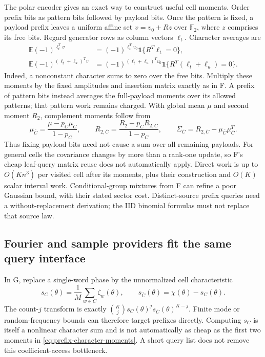 \documentclass[10pt,a4paper]{article}
\newcommand{\E}{\mathbb E}
\newcommand{\ind}{\mathbf 1}
\begin{document}
The polar encoder gives an exact way to construct useful cell moments. Order prefix bits as pattern bits
followed by payload bits. Once the pattern is fixed, a payload prefix leaves a uniform affine set
$v=v_0+Rz$ over $\mathbb F_2$, where $z$ comprises its free bits. Regard generator rows as column vectors
$\ell_t$. Character averages are
\begin{align}
 \E(-1)^{\ell_t^Tv}
   &=(-1)^{\ell_t^Tv_0}\ind\{R^T\ell_t=0\},\\
 \E(-1)^{(\ell_t+\ell_u)^Tv}
   &=(-1)^{(\ell_t+\ell_u)^Tv_0}\ind\{R^T(\ell_t+\ell_u)=0\}.
 \label{eq:prefix-character-moments}
\end{align}
Indeed, a nonconstant character sums to zero over the free bits. Multiply these moments by the fixed
amplitudes and insertion matrix exactly as in F. A prefix of pattern bits instead averages the full-payload
moments over its allowed patterns; that pattern work remains charged.
With global mean $\mu$ and second moment $R_2$, complement moments follow from
\[
 \mu_{\bar C}=\frac{\mu-p_C\mu_C}{1-p_C},\qquad
 R_{2,\bar C}=\frac{R_2-p_CR_{2,C}}{1-p_C},\qquad
 \Sigma_{\bar C}=R_{2,\bar C}-\mu_{\bar C}\mu_{\bar C}^T.
\]
Thus fixing payload bits need not cause a sum over all remaining payloads.
For general cells the covariance changes by more than a rank-one update, so F's cheap leaf-query matrix
reuse does not automatically apply. Direct work is up to $O(Kn^3)$ per visited cell after its moments,
plus their construction and $O(K)$ scalar interval work. Conditional-group mixtures from F can refine a
poor Gaussian bound, with their stated sector cost. Distinct-source prefix queries need a
without-replacement derivation; the IID binomial formulas must not replace that source law.

\subsection{Fourier and sample providers fit the same query interface}
In G, replace a single-word phase by the unnormalized cell characteristic
\[
 s_C(\theta)=\frac1M\sum_{w\in C}\zeta_w(\theta),\qquad
 s_{\bar C}(\theta)=\chi(\theta)-s_C(\theta).
\]
The count-$j$ transform is exactly
$\binom Kj s_C(\theta)^j s_{\bar C}(\theta)^{K-j}$.
Finite mode or random-frequency bounds can therefore target prefixes directly. Computing $s_C$ is itself
a nonlinear character sum and is not automatically as cheap as the first two moments in
\eqref{eq:prefix-character-moments}. A short query list does not remove this coefficient-access bottleneck.
\end{document}
